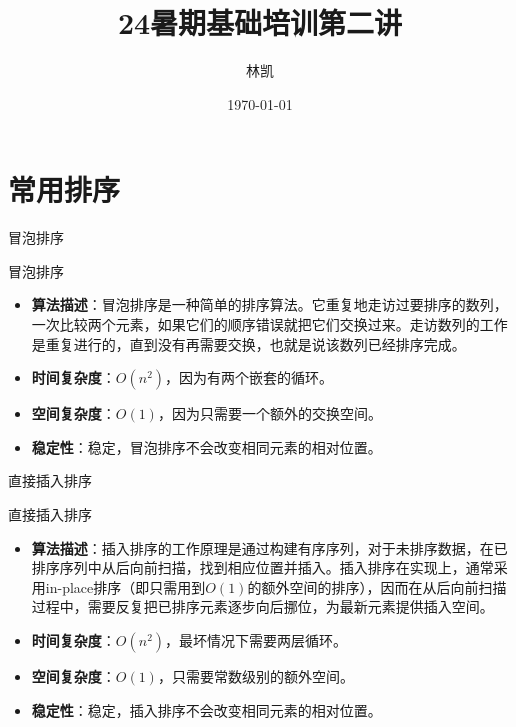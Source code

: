 \documentclass{beamer}
\title{24暑期基础培训第二讲}
\author{林凯}
\date{\today}
\begin{document}
\frame{\titlepage}

\section{常用排序}

\begin{frame}{冒泡排序}
    \begin{block}{冒泡排序}
        \begin{itemize}
            \item \textbf{算法描述}：冒泡排序是一种简单的排序算法。它重复地走访过要排序的数列，一次比较两个元素，如果它们的顺序错误就把它们交换过来。走访数列的工作是重复进行的，直到没有再需要交换，也就是说该数列已经排序完成。
            \item \textbf{时间复杂度}：$O(n^2)$，因为有两个嵌套的循环。
            \item \textbf{空间复杂度}：$O(1)$，因为只需要一个额外的交换空间。
            \item \textbf{稳定性}：稳定，冒泡排序不会改变相同元素的相对位置。
        \end{itemize}
    \end{block}
\end{frame}

\begin{frame}{直接插入排序}
    \begin{block}{直接插入排序}
        \begin{itemize}
            \item \textbf{算法描述}：插入排序的工作原理是通过构建有序序列，对于未排序数据，在已排序序列中从后向前扫描，找到相应位置并插入。插入排序在实现上，通常采用in-place排序（即只需用到$O(1)$的额外空间的排序），因而在从后向前扫描过程中，需要反复把已排序元素逐步向后挪位，为最新元素提供插入空间。
            \item \textbf{时间复杂度}：$O(n^2)$，最坏情况下需要两层循环。
            \item \textbf{空间复杂度}：$O(1)$，只需要常数级别的额外空间。
            \item \textbf{稳定性}：稳定，插入排序不会改变相同元素的相对位置。
        \end{itemize}
    \end{block}
\end{frame}
\end{document}
